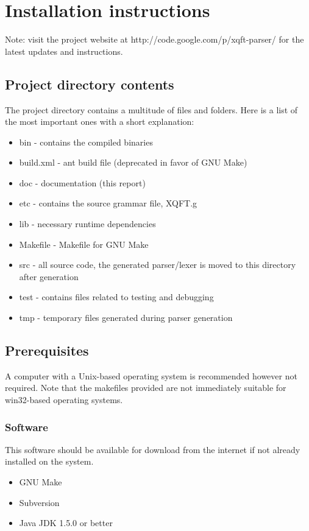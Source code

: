 \chapter{Installation instructions}
Note: visit the project website at http://code.google.com/p/xqft-parser/
for the latest updates and instructions.

\section*{Project directory contents}
The project directory contains a multitude of files and folders. Here is a list
of the most important ones with a short explanation:
\begin{itemize}
  \item bin - contains the compiled binaries
  \item build.xml - ant build file (deprecated in favor of GNU Make)
  \item doc - documentation (this report)
  \item etc - contains the source grammar file, XQFT.g
  \item lib - necessary runtime dependencies
  \item Makefile - Makefile for GNU Make
  \item src - all source code, the generated parser/lexer is moved to this
  directory after generation
  \item test - contains files related to testing and debugging
  \item tmp - temporary files generated during parser generation
\end{itemize}

\section*{Prerequisites}
A computer with a Unix-based operating system is recommended however not
required. Note that the makefiles provided are not immediately suitable for
win32-based operating systems.

\subsection*{Software}
This software should be available for download from the internet if not already
installed on the system.

\begin{itemize}
  \item GNU Make
  \item Subversion
  \item Java JDK 1.5.0 or better
\end{itemize}

